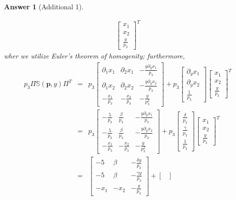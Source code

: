 \documentclass{article}
\newtheorem*{ans}{Answer}
\newcommand{\1}{{\bf 1}}
\newcommand{\bbS}{\mathbb{S}}
\newcommand{\0}{{\mathbf{0}}}
\newcommand{\p}{{\mathbf{p}}}
\newcommand{\<}{\langle}
\renewcommand{\>}{\rangle}
\begin{document}
\begin{ans}[Additional 1]
\begin{enumerate}[(a)]
\begin{eqnarray*}
\begin{bmatrix}
x_1 \\ x_2 \\ \frac{y}{p_3}
\end{bmatrix}^T 
\end{eqnarray*}
wher we utilize Euler's theorem of homogenity; furthermore,
\begin{eqnarray*}
p_3	\Pi 	\bbS(\p,y)  \Pi^T 
	&= & p_3 \begin{bmatrix}
		\partial_1 x_1 & 		\partial_2 x_1  & 	 -\frac{y \partial_y x_1}{p_3}\\
		\partial_1 x_2 & 		\partial_2 x_2  & 	 -\frac{y \partial_y x_2}{p_3} \\
		- \frac{x_1}{p_3} & 		- \frac{x_2}{p_3}  & 	-\frac{y}{ p_3^2}
	\end{bmatrix} + p_3 \begin{bmatrix}
		\partial_y x_1 \\ \partial_y x_2 \\ \frac1{p_3}
	\end{bmatrix}  \begin{bmatrix}
		x_1 \\ x_2 \\ \frac{y}{p_3}
	\end{bmatrix}^T \\
& = & p_3\begin{bmatrix}
	-\frac5{p_3} & \frac{ \beta }{p_3} & -\frac{y \partial_y x_1}{p_3} \\
	- \frac5{p_3} &  \frac{ \beta }{p_3}  & -\frac{y \partial_y x_2}{p_3} \\
- \frac{x_1}{p_3} & 		- \frac{x_2}{p_3}  & 	-\frac{y}{ p_3^2 }
\end{bmatrix}  +p_3  \begin{bmatrix}
\frac{ \delta }{p_3} \\ \frac{ \gamma }{p_3} \\ \frac1{p_3}
\end{bmatrix} \begin{bmatrix}
x_1 \\ x_2 \\ \frac{y}{p_3}
\end{bmatrix}  ^T \\
& =&\begin{bmatrix}
	- 5 &  \beta & - \frac{\delta y}{p_3} \\
	-  5 &  \beta  &-  \frac{\gamma y}{p_3}  \\
	- x_1  & 		- x_2  & 	-\frac{ y}{p_3}
\end{bmatrix}  +  \begin{bmatrix}

\end{bmatrix}
\end{eqnarray*}
\end{enumerate}
\end{ans}
\end{document}
